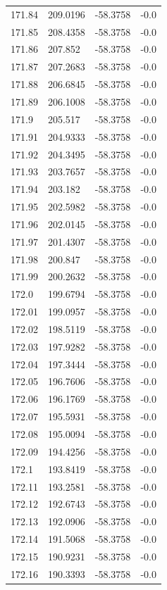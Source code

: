 \begin{table}[H]
\begin{tabular}{llll}
171.84 & 209.0196 & -58.3758 & -0.0 \\
171.85 & 208.4358 & -58.3758 & -0.0 \\
171.86 & 207.852 & -58.3758 & -0.0 \\
171.87 & 207.2683 & -58.3758 & -0.0 \\
171.88 & 206.6845 & -58.3758 & -0.0 \\
171.89 & 206.1008 & -58.3758 & -0.0 \\
171.9 & 205.517 & -58.3758 & -0.0 \\
171.91 & 204.9333 & -58.3758 & -0.0 \\
171.92 & 204.3495 & -58.3758 & -0.0 \\
171.93 & 203.7657 & -58.3758 & -0.0 \\
171.94 & 203.182 & -58.3758 & -0.0 \\
171.95 & 202.5982 & -58.3758 & -0.0 \\
171.96 & 202.0145 & -58.3758 & -0.0 \\
171.97 & 201.4307 & -58.3758 & -0.0 \\
171.98 & 200.847 & -58.3758 & -0.0 \\
171.99 & 200.2632 & -58.3758 & -0.0 \\
172.0 & 199.6794 & -58.3758 & -0.0 \\
172.01 & 199.0957 & -58.3758 & -0.0 \\
172.02 & 198.5119 & -58.3758 & -0.0 \\
172.03 & 197.9282 & -58.3758 & -0.0 \\
172.04 & 197.3444 & -58.3758 & -0.0 \\
172.05 & 196.7606 & -58.3758 & -0.0 \\
172.06 & 196.1769 & -58.3758 & -0.0 \\
172.07 & 195.5931 & -58.3758 & -0.0 \\
172.08 & 195.0094 & -58.3758 & -0.0 \\
172.09 & 194.4256 & -58.3758 & -0.0 \\
172.1 & 193.8419 & -58.3758 & -0.0 \\
172.11 & 193.2581 & -58.3758 & -0.0 \\
172.12 & 192.6743 & -58.3758 & -0.0 \\
172.13 & 192.0906 & -58.3758 & -0.0 \\
172.14 & 191.5068 & -58.3758 & -0.0 \\
172.15 & 190.9231 & -58.3758 & -0.0 \\
172.16 & 190.3393 & -58.3758 & -0.0 \\

\end{tabular}
\end{table}
